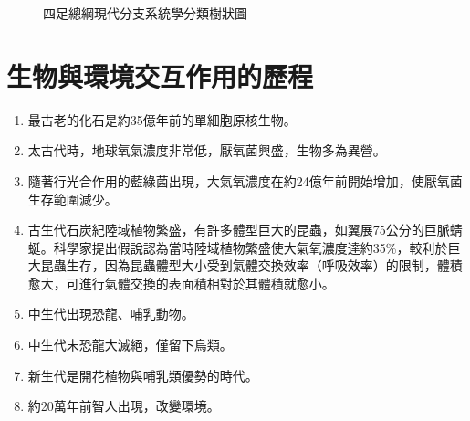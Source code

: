 \documentclass[a4paper,12pt]{report}
\begin{document}
{\begin{minipage}{\textwidth}
\begin{center}
\begin{figure}[H]
\caption{四足總綱現代分支系統學分類樹狀圖}
\end{figure}\FloatBarrier
\vspace*{\fill}
\end{center}
\end{minipage}
}
\nthm
\section{生物與環境交互作用的歷程}
\begin{enumerate}
\item 最古老的化石是約35億年前的單細胞原核生物。
\item 太古代時，地球氧氣濃度非常低，厭氧菌興盛，生物多為異營。
\item 隨著行光合作用的藍綠菌出現，大氣氧濃度在約24億年前開始增加，使厭氧菌生存範圍減少。
\item 古生代石炭紀陸域植物繁盛，有許多體型巨大的昆蟲，如翼展75公分的巨脈蜻蜓。科學家提出假說認為當時陸域植物繁盛使大氣氧濃度達約35\%，較利於巨大昆蟲生存，因為昆蟲體型大小受到氣體交換效率（呼吸效率）的限制，體積愈大，可進行氣體交換的表面積相對於其體積就愈小。
\item 中生代出現恐龍、哺乳動物。
\item 中生代末恐龍大滅絕，僅留下鳥類。
\item 新生代是開花植物與哺乳類優勢的時代。
\item 約20萬年前智人出現，改變環境。
\end{enumerate}
\end{document}
